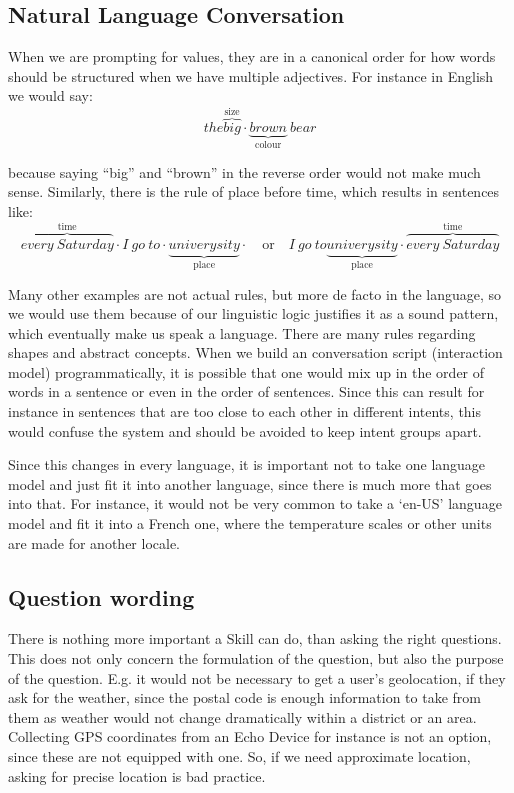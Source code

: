 \subsection*{Natural Language Conversation}
When we are prompting for values, they are in a canonical order for how words should be structured when we have multiple adjectives. For instance in English we would say:
\[
	the 
\overbrace{big}^\text{size} \cdot
\underbrace{brown}_\text{colour}
\ bear 
\]

\noindent because saying ``big'' and ``brown'' in the reverse order would not make much sense. Similarly, there is the rule of place before time, which results in sentences like: 
	\[
	\overbrace{every \ Saturday}^\text{time} \cdot
		I \ go \ to  \cdot
	\underbrace{univerysity}_\text{place} \cdot
	\quad \textrm{or} \quad
	I \ go \ to 
	\underbrace{univerysity}_\text{place} \cdot
	\overbrace{every \ Saturday}^\text{time}
	\]

Many other examples are not actual rules, but more de facto	in the language, so we would use them because of our linguistic logic justifies it as a sound pattern, which eventually make us speak a language. There are many rules regarding shapes and abstract concepts. When we build an conversation script (interaction model) programmatically, it is possible that one would mix up in the order of words in a sentence or even in the order of sentences. Since this can result for instance in sentences that are too close to each other in different intents, this would confuse the system and should be avoided to keep intent groups apart.

Since this changes in every language, it is important not to take one language model and just fit it into another language, since there is much more that goes into that. For instance, it would not be very common to take a `en-US' language model and fit it into a French one, where the temperature scales or other units are made for another locale.


\subsection*{Question wording}
There is nothing more important a Skill can do, than asking the right questions. This does not only concern the formulation of the question, but also the purpose of the question. E.g. it would not be necessary to get a user's geolocation, if they ask for the weather, since the postal code is enough information to take from them as weather would not change dramatically within a district or an area. Collecting GPS coordinates from an Echo Device for instance is not an option, since these are not equipped with one. So, if we need approximate location, asking for precise location is bad practice.

